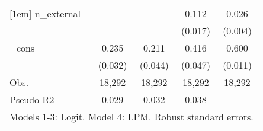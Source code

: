\begin{table}[htbp]
\begin{tabular}{l*{4}{c}}
[1em]
n\_external  &                     &                     &       0.112\sym{***}&       0.026\sym{***}\\
            &                     &                     &     (0.017)         &     (0.004)         \\
[1em]
\_cons      &       0.235\sym{***}&       0.211\sym{***}&       0.416\sym{***}&       0.600\sym{***}\\
            &     (0.032)         &     (0.044)         &     (0.047)         &     (0.011)         \\
\hline
Obs.        &      18,292         &      18,292         &      18,292         &      18,292         \\
Pseudo R2   &       0.029         &       0.032         &       0.038         &                     \\
\hline\hline
\multicolumn{5}{l}{\footnotesize Models 1-3: Logit. Model 4: LPM. Robust standard errors.}\\
\end{tabular}
\end{table}
